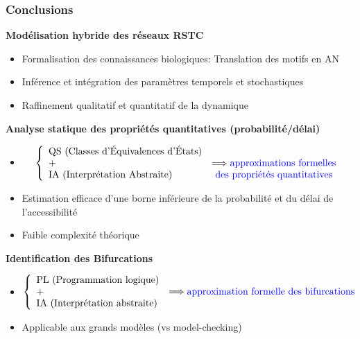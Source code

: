 \begin{frame}[c]
  \frametitle{Conclusions}

{\small
\pause
\textbf{Modélisation hybride des réseaux RSTC}
  \begin{itemize}
   \item Formalisation des connaissances biologiques: Translation des motifs en AN
   \item Inférence et intégration des paramètres temporels et stochastiques
   \item Raffinement qualitatif et quantitatif de la dynamique
  \end{itemize}
\pause
\textbf{Analyse statique des propriétés quantitatives (probabilité/délai)}
\begin{itemize}
 \item 
  $$
\left\{
    \begin{array}{lcl}
        \mbox{QS (Classes d'\'Equivalences d'\'Etats)} &\\  %
        \mbox{+} & \Longrightarrow \mbox{\tval{approximations formelles}} \\
        \mbox{IA (Interprétation Abstraite)} & \mbox{\tval{des propriétés quantitatives}}
    \end{array}
\right.
$$ 
 \item Estimation efficace d'une borne inférieure de la probabilité et du délai de l'accessibilité 
 \item Faible complexité théorique
\end{itemize}


\pause
\textbf{Identification des Bifurcations}
 \begin{itemize}
\item 
$$
\left\{
    \begin{array}{lcl}
        \mbox{PL (Programmation logique)} &\\  %
        \mbox{+} & \Longrightarrow \mbox{\tval{approximation formelle des bifurcations}} \\
        \mbox{IA (Interprétation abstraite)} &
    \end{array}
\right.
$$ 
   \item Applicable aux grands modèles  (vs model-checking)
  \end{itemize}
\medskip
}
\end{frame}




